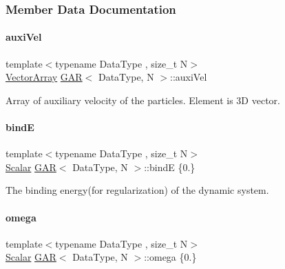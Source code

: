 \subsubsection{Member Data Documentation}
\mbox{\label{class_g_a_r_ade7c1f936a5f23a0ded2d02b2cc750e6}} 
\paragraph{\texorpdfstring{auxi\+Vel}{auxiVel}}
{\footnotesize\ttfamily template$<$typename Data\+Type , size\+\_\+t N$>$ \\
\mbox{\hyperlink{class_g_a_r_a5818e17eb203504af6e10f38fc38d378}{Vector\+Array}} \mbox{\hyperlink{class_g_a_r}{G\+AR}}$<$ Data\+Type, N $>$\+::auxi\+Vel}



Array of auxiliary velocity of the particles. Element is 3D vector. 

\mbox{\label{class_g_a_r_a10f49216d9cacb2b21bd053a2ddb997c}} 
\paragraph{\texorpdfstring{bindE}{bindE}}
{\footnotesize\ttfamily template$<$typename Data\+Type , size\+\_\+t N$>$ \\
\mbox{\hyperlink{class_g_a_r_a2ae44eda8e28d5dd26cf707dcda69314}{Scalar}} \mbox{\hyperlink{class_g_a_r}{G\+AR}}$<$ Data\+Type, N $>$\+::bindE \{0.\}}



The binding energy(for regularization) of the dynamic system. 

\mbox{\label{class_g_a_r_a702f19b87d8754ac66914985d7c8229e}} 
\paragraph{\texorpdfstring{omega}{omega}}
{\footnotesize\ttfamily template$<$typename Data\+Type , size\+\_\+t N$>$ \\
\mbox{\hyperlink{class_g_a_r_a2ae44eda8e28d5dd26cf707dcda69314}{Scalar}} \mbox{\hyperlink{class_g_a_r}{G\+AR}}$<$ Data\+Type, N $>$\+::omega \{0.\}}



